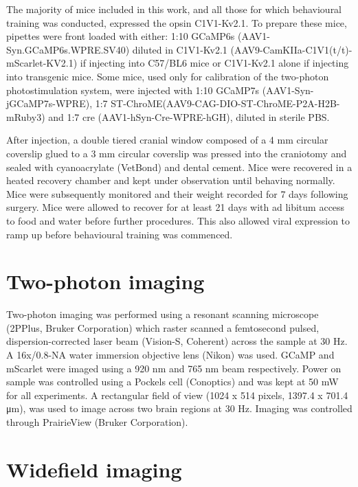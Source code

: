  The majority of mice included in this work, and all those for which behavioural training was conducted, expressed the opsin C1V1-Kv2.1. To prepare these mice, pipettes were front loaded with either: 1:10 GCaMP6s (AAV1-Syn.GCaMP6s.WPRE.SV40) diluted in C1V1-Kv2.1 (AAV9-CamKIIa-C1V1(t/t)-mScarlet-KV2.1) if injecting into C57/BL6 mice or C1V1-Kv2.1 alone if injecting into transgenic mice. Some mice, used only for calibration of the two-photon photostimulation system, were injected with 1:10 GCaMP7s (AAV1-Syn-jGCaMP7s-WPRE), 1:7 ST-ChroME(AAV9-CAG-DIO-ST-ChroME-P2A-H2B-mRuby3) and 1:7 cre (AAV1-hSyn-Cre-WPRE-hGH), diluted in sterile PBS.

After injection, a double tiered cranial window composed of a 4 mm circular coverslip glued to a 3 mm circular coverslip was pressed into the craniotomy and sealed with cyanoacrylate (VetBond) and dental cement. Mice were recovered in a heated recovery chamber and kept under observation until behaving normally. Mice were subsequently monitored and their weight recorded for 7 days following surgery. Mice were allowed to recover for at least 21 days with ad libitum access to food and water before further procedures. This also allowed viral expression to ramp up before behavioural training was commenced.

\section{Two-photon imaging}
Two-photon imaging was performed using a resonant scanning microscope (2PPlus, Bruker Corporation) which raster scanned a femtosecond pulsed, dispersion-corrected laser beam (Vision-S, Coherent) across the sample at 30 Hz. A 16x/0.8-NA water immersion objective lens (Nikon) was used. GCaMP and mScarlet were imaged using a 920 nm and 765 nm beam respectively. Power on sample was controlled using a Pockels cell (Conoptics) and was kept at 50 mW for all experiments. A rectangular field of view (1024 x 514 pixels, 1397.4 x 701.4 μm), was used to image across two brain regions at 30 Hz. Imaging was controlled through PrairieView (Bruker Corporation).

\section{Widefield imaging}

